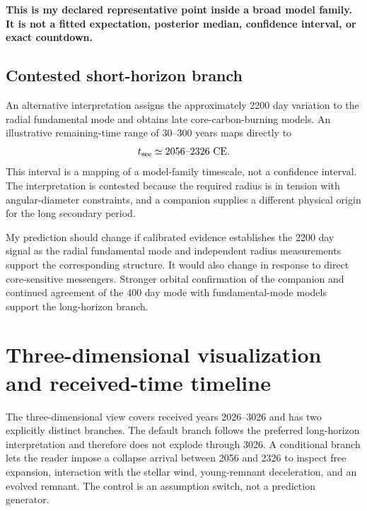 \documentclass[11pt,a4paper]{article}
\newcommand{\caveat}[1]{\textcolor{amber}{\textbf{#1}}}
\begin{document}
\caveat{This is my declared representative point inside a broad model family. It is not a fitted expectation, posterior median, confidence interval, or exact countdown.}

\subsection{Contested short-horizon branch}

An alternative interpretation assigns the approximately 2200 day variation to the radial fundamental mode and obtains late core-carbon-burning models. An illustrative remaining-time range of 30--300 years maps directly to
\begin{equation}
t_{\rm see}\simeq 2056\text{--}2326\ \mathrm{CE}.
\end{equation}
This interval is a mapping of a model-family timescale, not a confidence interval. The interpretation is contested because the required radius is in tension with angular-diameter constraints, and a companion supplies a different physical origin for the long secondary period.

My prediction should change if calibrated evidence establishes the 2200 day signal as the radial fundamental mode and independent radius measurements support the corresponding structure. It would also change in response to direct core-sensitive messengers. Stronger orbital confirmation of the companion and continued agreement of the 400 day mode with fundamental-mode models support the long-horizon branch.

\section{Three-dimensional visualization and received-time timeline}

The three-dimensional view covers received years 2026--3026 and has two explicitly distinct branches. The default branch follows the preferred long-horizon interpretation and therefore does not explode through 3026. A conditional branch lets the reader impose a collapse arrival between 2056 and 2326 to inspect free expansion, interaction with the stellar wind, young-remnant deceleration, and an evolved remnant. The control is an assumption switch, not a prediction generator.
\end{document}

